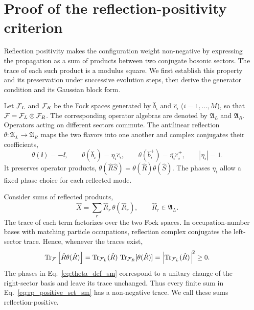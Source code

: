 \section{Proof of the reflection-positivity criterion}
\label{app:rp_proof}

Reflection positivity makes the configuration weight non-negative by expressing the propagation as a sum of products between two conjugate bosonic sectors. The trace of each such product is a modulus square. We first establish this property and its preservation under successive evolution steps, then derive the generator condition and its Gaussian block form.

Let $\mathcal{F}_L$ and $\mathcal{F}_R$ be the Fock spaces generated by $\hat b_i$ and $\hat c_i$ ($i=1,\ldots,M$), so that $\mathcal{F}=\mathcal{F}_L\otimes\mathcal{F}_R$. The corresponding operator algebras are denoted by $\mathfrak A_L$ and $\mathfrak A_R$. Operators acting on different sectors commute. The antilinear reflection $\theta:\mathfrak A_L\to\mathfrak A_R$ maps the two flavors into one another and complex conjugates their coefficients,
\begin{equation}
    \theta(\ii)=-\ii,\qquad
    \theta(\hat b_i)=\eta_i\hat c_i,\qquad
    \theta(\hat b_i^+)=\overline{\eta_i}\hat c_i^+,
    \qquad |\eta_i|=1.
    \label{eq:theta_def_sm}
\end{equation}
It preserves operator products, $\theta(\hat R\hat S)=\theta(\hat R)\theta(\hat S)$. The phases $\eta_i$ allow a fixed phase choice for each reflected mode.

Consider sums of reflected products,
\begin{equation}
    \hat X=\sum_r \hat R_r\,\theta(\hat R_r),
    \qquad
    \hat R_r\in\mathfrak A_L.
    \label{eq:rp_positive_set_sm}
\end{equation}
The trace of each term factorizes over the two Fock spaces. In occupation-number bases with matching particle occupations, reflection complex conjugates the left-sector trace. Hence, whenever the traces exist,
\begin{equation}
    \operatorname{Tr}_{\mathcal{F}}\left[\hat R\theta(\hat R)\right]
    =
    \operatorname{Tr}_{\mathcal{F}_L}(\hat R)\,
    \operatorname{Tr}_{\mathcal{F}_R}[\theta(\hat R)]
    =
    \left|\operatorname{Tr}_{\mathcal{F}_L}(\hat R)\right|^2
    \ge0.
\end{equation}
The phases in Eq.~\eqref{eq:theta_def_sm} correspond to a unitary change of the right-sector basis and leave its trace unchanged. Thus every finite sum in Eq.~\eqref{eq:rp_positive_set_sm} has a non-negative trace. We call these sums reflection-positive.

